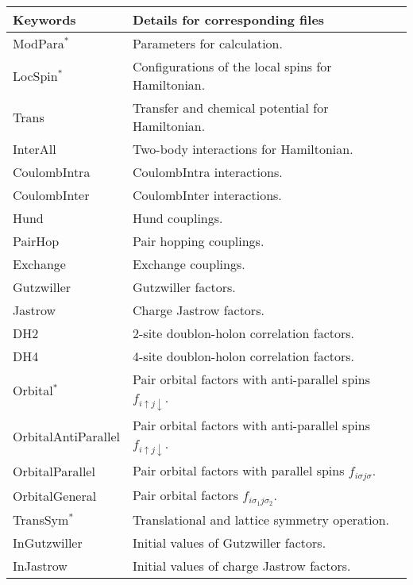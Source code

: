  \begin{table*}[h!]
\begin{center}
  \begin{tabular}{|ll|} \hline
           Keywords     & Details for corresponding files       \\   \hline\hline
           ModPara$^*$        &  Parameters for calculation.        \\ \hline 
           LocSpin$^*$          &  Configurations of the local spins for Hamiltonian.         \\ 
           Trans       &   Transfer and chemical potential for Hamiltonian.  \\
           InterAll  &   Two-body interactions for Hamiltonian. \\  
           CoulombIntra  &   CoulombIntra interactions. \\  
           CoulombInter  &   CoulombInter  interactions. \\  
           Hund  &   Hund couplings. \\  
           PairHop  &  Pair hopping couplings. \\  
           Exchange  &  Exchange couplings. \\  \hline
           Gutzwiller & Gutzwiller factors.\\
           Jastrow & Charge Jastrow factors.\\
           DH2 & 2-site doublon-holon correlation factors.\\
           DH4 & 4-site doublon-holon correlation factors.\\
           Orbital$^*$  & Pair orbital factors with anti-parallel spins $f_{i\uparrow j\downarrow}$.\\
           OrbitalAntiParallel & Pair orbital factors with anti-parallel spins $f_{i\uparrow j\downarrow}$.\\
           OrbitalParallel  & Pair orbital factors with parallel spins $f_{i\sigma j\sigma}$.\\
           OrbitalGeneral  & Pair orbital factors $f_{i\sigma_1 j\sigma_2}$.\\
           TransSym$^*$  & Translational and lattice symmetry operation. \\ \hline
           InGutzwiller & Initial values of Gutzwiller factors.\\
           InJastrow & Initial values of charge Jastrow factors.\\

\end{tabular}
\end{center}
\end{table*}
